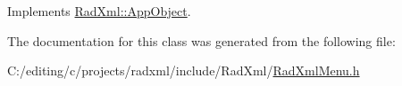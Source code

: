Implements \hyperlink{class_rad_xml_1_1_app_object_a677e0af301973343665699f6d07f2018}{Rad\-Xml\-::\-App\-Object}.



The documentation for this class was generated from the following file\-:\begin{DoxyCompactItemize}
\item 
C\-:/editing/c/projects/radxml/include/\-Rad\-Xml/\hyperlink{_rad_xml_menu_8h}{Rad\-Xml\-Menu.\-h}\end{DoxyCompactItemize}
